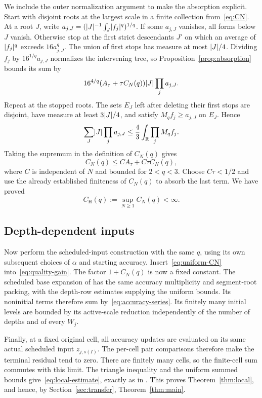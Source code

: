 We include the outer normalization argument to make the absorption
explicit. Start with disjoint roots at the largest scale in a finite
collection from~\eqref{eq:CN}. At a root $J$, write
$a_{j,J}=(\lvert J\rvert^{-1}\int_J\lvert f_j\rvert^q)^{1/q}$. If some $a_{j,J}$
vanishes, all forms below $J$ vanish. Otherwise stop at the first
strict descendants $J'$ on which an average of $\lvert f_j\rvert^q$
exceeds $16a_{j,J}^q$. The union of first stops has measure at most
$\lvert J\rvert/4$. Dividing $f_j$ by $16^{1/q}a_{j,J}$ normalizes the
intervening tree, so Proposition~\ref{prop:absorption} bounds its sum
by
\[
 16^{4/q}(A_\tau+\tau C_N(q))\lvert J\rvert\prod_ja_{j,J}.
\]
Repeat at the stopped roots. The sets $E_J$ left after deleting their
first stops are disjoint, have measure at least $3\lvert J\rvert/4$, and
satisfy $M_qf_j\ge a_{j,J}$ on $E_J$. Hence
\[
 \sum_J\lvert J\rvert\prod_ja_{j,J}
 \le\frac43\int_\mathbb R\prod_jM_qf_j.
\]
Taking the supremum in the definition of $C_N(q)$ gives
\[
 C_N(q)\le C A_\tau+C\tau C_N(q),
\]
where $C$ is independent of $N$ and bounded for $2<q<3$.
Choose $C\tau<1/2$ and use the already established finiteness of
$C_N(q)$ to absorb the last term. We have proved
\begin{equation}\label{eq:uniform-CN}
 C_{\mathrm H}(q):=\sup_{N\ge1}C_N(q)<\infty.
\end{equation}

\subsection{Depth-dependent inputs}
Now perform the scheduled-input construction with the same $q$,
using its own subsequent choices of $\alpha$ and starting accuracy.
Insert~\eqref{eq:uniform-CN} into~\eqref{eq:quality-gain}. The
factor $1+C_N(q)$ is now a fixed constant. The scheduled base
expansion of \cite[Section~5]{V} has the same accuracy multiplicity
and segment-root packing, with the depth-row estimates supplying
the uniform bounds. Its noninitial terms therefore sum
by~\eqref{eq:accuracy-series}. Its finitely many initial levels
are bounded by its active-scale reduction independently of the
number of depths and of every $W_j$.

Finally, at a fixed original cell, all accuracy updates are evaluated
on its same actual scheduled input $z_{j,s(I)}$. The per-cell pair
comparisons therefore make the terminal residual tend to zero.
There are finitely many cells, so the finite-cell sum commutes with
this limit. The triangle inequality and the uniform summed bounds
give~\eqref{eq:local-estimate}, exactly as in
\cite[Section~7.4]{V}. This proves Theorem~\ref{thm:local}, and hence,
by Section~\ref{sec:transfer}, Theorem~\ref{thm:main}.
